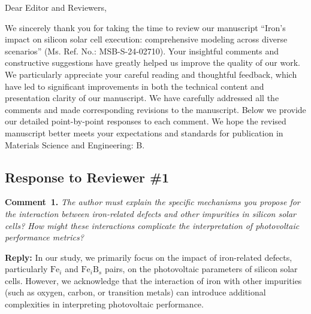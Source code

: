 \documentclass[a4paper,fleqn]{cas-sc}
\begin{document}
\shorttitle{}


%


Dear Editor and Reviewers,

We sincerely thank you for taking the time to review our manuscript 
``Iron's impact on silicon solar cell execution: comprehensive modeling across diverse scenarios''
(Ms. Ref. No.: MSB-S-24-02710). 
Your insightful comments and constructive suggestions have greatly helped us improve
the quality of our work. 
We particularly appreciate your careful reading and thoughtful feedback, which have
led to significant improvements in both the technical content and presentation clarity of our manuscript.
We have carefully addressed all the comments and made corresponding revisions to the manuscript. 
Below we provide our detailed point-by-point responses to
each comment. 
We hope the revised manuscript better meets your expectations and standards for publication in Materials Science and Engineering: B.


\subsection*{Response to Reviewer \#1 }

\noindent
\textcolor[rgb]{0.00,0.50,1.00}{\textbf{Comment~1.}}
\emph{The author must explain the specific mechanisms you propose for the interaction between iron-related defects and other impurities in silicon solar cells? How might these interactions complicate the interpretation of photovoltaic performance metrics?}

\noindent
\textcolor[rgb]{0.51,0.00,0.00}{\textbf{Reply:}}
In our study, we primarily focus on the impact of iron-related defects, particularly $\mathrm{Fe}_i$ and $\mathrm{Fe}_i\mathrm{B}_s$ pairs, on the photovoltaic parameters of silicon solar cells. However, we acknowledge that the interaction of iron with other impurities (such as oxygen, carbon, or transition metals) can introduce additional complexities in interpreting photovoltaic performance.
\end{document}
